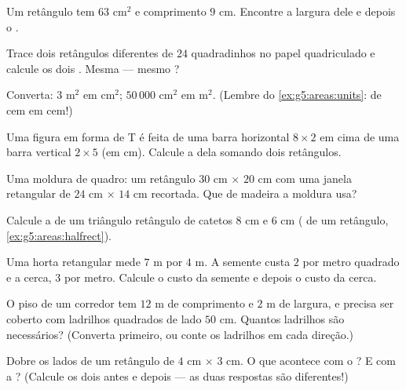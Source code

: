 \begin{exercise}[$\star$]\label{exo:g5:areas:3}
Um retângulo tem  $63$ cm$^2$ e comprimento $9$ cm. Encontre a
largura dele e depois o .
\end{exercise}

\begin{exercise}[$\star$]\label{exo:g5:areas:4}
Trace dois retângulos diferentes de  $24$ quadradinhos no papel
quadriculado e calcule os dois . Mesma  --- mesmo
?
\end{exercise}

\begin{exercise}[$\star$]\label{exo:g5:areas:5}
Converta: $3$ m$^2$ em cm$^2$; \quad $50\,000$ cm$^2$ em m$^2$.
(Lembre do \cref{ex:g5:areas:units}: de cem em cem!)
\end{exercise}

\begin{exercise}[$\star$]\label{exo:g5:areas:6}
Uma figura em forma de T é feita de uma barra horizontal $8 \times 2$
em cima de uma barra vertical $2 \times 5$ (em cm). Calcule a 
dela somando dois retângulos.
\end{exercise}

\begin{exercise}[$\star$]\label{exo:g5:areas:7}
Uma moldura de quadro: um retângulo $30$ cm $\times$ $20$ cm com uma
janela retangular de $24$ cm $\times$ $14$ cm recortada. Que  de
madeira a moldura usa?
\end{exercise}

\begin{exercise}[$\star$]\label{exo:g5:areas:8}
Calcule a  de um triângulo retângulo de catetos $8$ cm e $6$ cm
( de um retângulo, \cref{ex:g5:areas:halfrect}).
\end{exercise}

\begin{exercise}[$\star$]\label{exo:g5:areas:9}
Uma horta retangular mede $7$ m por $4$ m. A semente custa $2$ por
metro quadrado e a cerca, $3$ por metro. Calcule o custo da semente e
depois o custo da cerca.
\end{exercise}

\begin{exercise}[$\star\star$]\label{exo:g5:areas:10}
O piso de um corredor tem $12$ m de comprimento e $2$ m de largura, e
precisa ser coberto com ladrilhos quadrados de lado $50$ cm. Quantos
ladrilhos são necessários? (Converta primeiro, ou conte os ladrilhos
em cada direção.)
\end{exercise}

\begin{exercise}[$\star\star$]\label{exo:g5:areas:11}
Dobre os lados de um retângulo de $4$ cm $\times$ $3$ cm. O que
acontece com o ? E com a ? (Calcule os dois antes e
depois --- as duas respostas são diferentes!)
\end{exercise}
